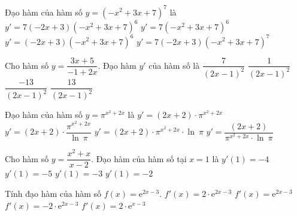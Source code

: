 \begin{ex}%
	Đạo hàm của  hàm số $y=(-x^2+3x+7)^7$ là
	\choice 
		 {\True $y'=7(-2x+3)(-x^2+3x+7)^6$}
		 {$y'=7(-x^2+3x+7)^6$}
		 {$y'=(-2x+3)(-x^2+3x+7)^6$}
		 {$y'=7(-2x+3)(-x^2+3x+7)^7$}
\end{ex}

\begin{ex}%
	Cho hàm số  $y=\dfrac{3x+5}{-1+2x}$. Đạo hàm $y'$ của hàm số là
	\choice 
		 {$\dfrac{7}{(2x-1)^2}$}
		{$\dfrac{1}{(2x-1)^2}$} 
		 {\True $\dfrac{-13}{(2x-1)^2}$}
		 {$\dfrac{13}{(2x-1)^2}$}
\end{ex}

\begin{ex}%
	Đạo hàm của hàm số  $y=\pi^{x^{2}+2x}$ là
	 \choice
		{$y'=(2x+2) \cdot \pi^{x^{2}+2x}$} 
		 {$y'=(2x+2) \cdot \dfrac{\pi^{x^{2}+2x}}{\ln~\pi}$}
		{\True  $y'=(2x+2) \cdot \pi^{x^{2}+2x} \cdot \ln~\pi$}
		{$y'=\dfrac{(2x+2)}{\pi^{x^{2}+2x} \cdot  \ln~\pi}$}
\end{ex}

\begin{ex}%
	Cho hàm số $y=\dfrac{x^2+x}{x-2}$. Đạo hàm của hàm số  tại $x=1$ là
	 \choice
		 {$y'(1)=-4$}
		{\True  $y'(1)=-5$}
		{$y'(1)=-3$} 
		{$y'(1)=-2$} 
\end{ex}

\begin{ex}%
	Tính đạo hàm của  hàm số $f(x)=\mathrm{e}^{2x-3}$.
	 \choice
		{\True  $f'(x)=2\cdot\mathrm{e}^{2x-3}$}
		{$f'(x)=\mathrm{e}^{2x-3}$} 
		{$f'(x)=-2\cdot\mathrm{e}^{2x-3}$} 
		 {$f'(x)=2\cdot\mathrm{e}^{x-3}$}
\end{ex}

